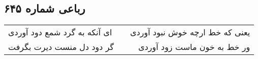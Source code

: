\begin{center}
\section*{رباعی شماره ۶۴۵}
\label{sec:sh645}
\begin{longtable}{l p{0.5cm} r}
ای آنکه به گرد شمع دود آوردی
&&
یعنی که خط ارچه خوش نبود آوردی
\\
گر دود دل منست دیرت بگرفت
&&
ور خط به خون ماست زود آوردی
\\
\end{longtable}
\end{center}
